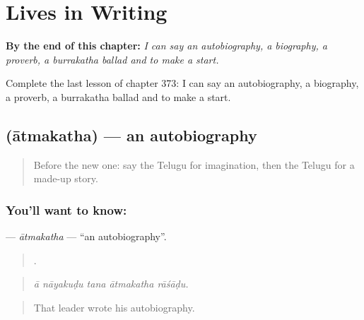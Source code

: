 
\chapter{Lives in Writing}
\label{ch:te-lives-in-writing}

\begin{chapteropening}
\textbf{By the end of this chapter:} \emph{I can say an autobiography, a biography, a proverb, a burrakatha ballad and to make a start.}

Complete the last lesson of chapter 373: I can say an autobiography, a biography, a proverb, a burrakatha ballad and to make a start.
\end{chapteropening}

\section[\texorpdfstring{\te{ఆత్మకథ} (ātmakatha)}{ఆత్మకథ (ātmakatha)}]{ (ātmakatha) — an autobiography}

\label{lesson:TE-C373-atmakatha}



\begin{quote}
Before the new one: say the Telugu for imagination, then the Telugu for a made-up story.
\end{quote}

\subsection*{You'll want to know: }
\textbf{} — \emph{ātmakatha} — \textquotedblleft{}an autobiography\textquotedblright{}.

\begin{quote}
    .
\end{quote}

\begin{quote}
\emph{ā nāyakuḍu tana ātmakatha rāśāḍu.}
\end{quote}

\begin{quote}
That leader wrote his autobiography.
\end{quote}

